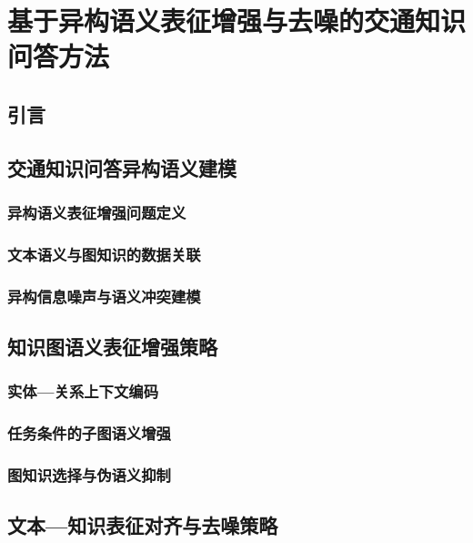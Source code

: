 
\chapter{基于异构语义表征增强与去噪的交通知识问答方法}

\section{引言}

\section{交通知识问答异构语义建模}

\subsection{异构语义表征增强问题定义}

\subsection{文本语义与图知识的数据关联}

\subsection{异构信息噪声与语义冲突建模}

\section{知识图语义表征增强策略}

\subsection{实体—关系上下文编码}

\subsection{任务条件的子图语义增强}

\subsection{图知识选择与伪语义抑制}

\section{文本—知识表征对齐与去噪策略}

